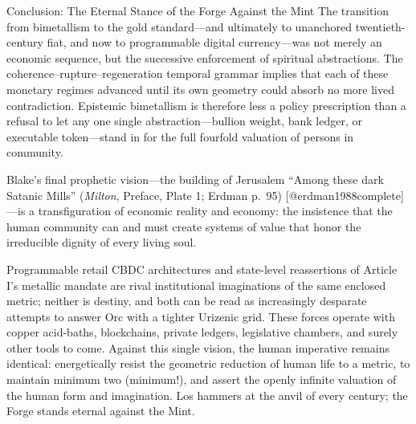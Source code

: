 \documentclass[
  ignorenonframetext,
]{beamer}
\author{\texorpdfstring{}{}}
\date{}
\begin{document}
\begin{frame}{Conclusion: The Eternal Stance of the Forge Against the
Mint}
\protect{}\label{conclusion-the-eternal-stance-of-the-forge-against-the-mint}
The transition from bimetallism to the gold standard---and ultimately to
unanchored twentieth-century fiat, and now to programmable digital
currency---was not merely an economic sequence, but the successive
enforcement of spiritual abstractions. The
coherence--rupture--regeneration temporal grammar implies that each of
these monetary regimes advanced until its own geometry could absorb no
more lived contradiction. Epistemic bimetallism is therefore less a
policy prescription than a refusal to let any one single
abstraction---bullion weight, bank ledger, or executable token---stand
in for the full fourfold valuation of persons in community.

Blake's final prophetic vision---the building of Jerusalem ``Among these
dark Satanic Mills'' (\emph{Milton}, Preface, Plate 1; Erdman p.~95)
{[}@erdman1988complete{]}---is a transfiguration of economic reality and
economy: the insistence that the human community can and must create
systems of value that honor the irreducible dignity of every living
soul.

Programmable retail CBDC architectures and state-level reassertions of
Article I's metallic mandate are rival institutional imaginations of the
same enclosed metric; neither is destiny, and both can be read as
increasingly desparate attempts to answer Orc with a tighter Urizenic
grid. These forces operate with copper acid-baths, blockchains, private
ledgers, legislative chambers, and surely other tools to come. Against
this single vision, the human imperative remains identical:
energetically resist the geometric reduction of human life to a metric,
to maintain minimum two (minimum!), and assert the openly infinite
valuation of the human form and imagination. Los hammers at the anvil of
every century; the Forge stands eternal against the Mint.
\end{frame}
\end{document}
